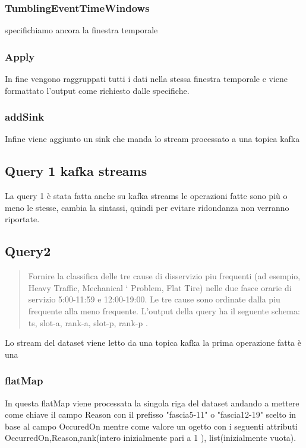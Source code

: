 \documentclass[acmsmall]{acmart}
\begin{document}
\subsubsection{TumblingEventTimeWindows}
specifichiamo ancora la finestra temporale

\subsubsection{Apply}
In fine vengono raggruppati tutti i dati nella stessa finestra temporale e viene formattato l'output come richiesto dalle specifiche.
\subsubsection{addSink}
Infine viene aggiunto un sink che manda lo stream processato a una topica kafka

\subsection{Query 1 kafka streams}
La query 1 è stata fatta anche su kafka streams le operazioni fatte sono più o meno le stesse, cambia la sintassi, quindi per evitare ridondanza non verranno riportate.


\subsection{Query2}
\begin{quote}
Fornire la classifica delle tre cause di disservizio piu frequenti (ad esempio, Heavy Traffic, Mechanical `
Problem, Flat Tire) nelle due fasce orarie di servizio 5:00-11:59 e 12:00-19:00. Le tre cause sono ordinate dalla piu frequente alla meno frequente. L’output della query ha il seguente schema:
ts, slot-a, rank-a, slot-p, rank-p .\end{quote}

Lo stream del dataset viene letto da una topica kafka la prima operazione fatta 
è una 

\subsubsection{flatMap}
In questa flatMap viene processata la singola riga del dataset andando a mettere come chiave il campo Reason con il prefisso "fascia5-11" o "fascia12-19" scelto in base al campo OccuredOn mentre come valore un ogetto con i seguenti attributi
OccurredOn,Reason,rank(intero inizialmente pari a 1 ), list(inizialmente vuota).
\end{document}
